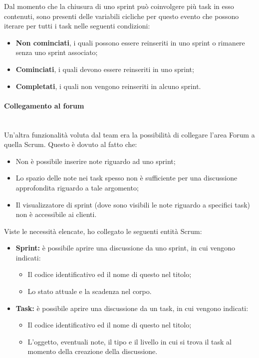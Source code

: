 Dal momento che la chiusura di uno sprint può coinvolgere più task in esso
contenuti, sono presenti delle variabili cicliche per questo evento che
possono iterare per tutti i task nelle seguenti condizioni:

\begin{itemize}
\item \textbf{Non cominciati}, i quali possono essere reinseriti in uno sprint
  o rimanere senza uno sprint associato;
\item \textbf{Cominciati}, i quali devono essere reinseriti in uno sprint;
\item \textbf{Completati}, i quali non vengono reinseriti in alcuno sprint.
\end{itemize}

\paragraph{Collegamento al forum} \mbox{} \\

Un'altra funzionalità voluta dal team era la possibilità di collegare l'area
Forum a quella Scrum. Questo è dovuto al fatto che:

\begin{itemize}
\item Non è possibile inserire note riguardo ad uno sprint;
\item Lo spazio delle note nei task spesso non è sufficiente per una
  discussione approfondita riguardo a tale argomento;
\item Il visualizzatore di sprint (dove sono visibili le note riguardo a
  specifici task) non è accessibile ai clienti.
\end{itemize}

Viste le necessità elencate, ho collegato le seguenti entità Scrum:

\begin{itemize}
\item \textbf{Sprint:} è possibile aprire una discussione da uno sprint, in
  cui vengono indicati:
  \begin{itemize}
  \item Il codice identificativo ed il nome di questo nel titolo;
  \item Lo stato attuale e la scadenza nel corpo.
  \end{itemize}
\item \textbf{Task:} è possibile aprire una discussione da un task, in
  cui vengono indicati:
  \begin{itemize}
  \item Il codice identificativo ed il nome di questo nel titolo;
  \item L'oggetto, eventuali note, il tipo e il livello in cui si trova il
    task al momento della creazione della discussione.
  \end{itemize}
\end{itemize}

